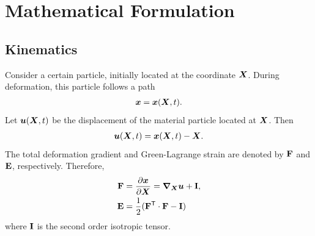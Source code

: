 
\chapter{Mathematical Formulation}

\section{Kinematics}
Consider a certain particle, initially located at the coordinate ${\bm{X}}$. During deformation, this particle follows a path 
\begin{gather}
{\bm{x}} = {\bm{x}}({\bm{X}},t).
\end{gather}
Let ${\bm{u}}({\bm{X}}, t)$ be the displacement of the material particle located at ${\bm{X}}$. Then
\begin{gather}
    {\bm{u}}({\bm{X}}, t) = {\bm{x}}({\bm{X}}, t) - {\bm{X}}.
\end{gather}
The total deformation gradient and Green-Lagrange strain are denoted by $\mathbf{F}$ and $\mathbf{E}$, respectively. Therefore, 
\begin{align}
    \mathbf{F} &= \frac{\partial {\bm{x}}}{\partial {\bm{X}}} = \bm{\nabla}_{\bm{X}} {\bm{u}} + \mathbf{I}, \\
    \mathbf{E} &= \frac{1}{2}(\mathbf{F}^{\sf {T}} \cdot \mathbf{F} - \mathbf{I})
\end{align}
where $\mathbf{I}$ is the second order isotropic tensor.

